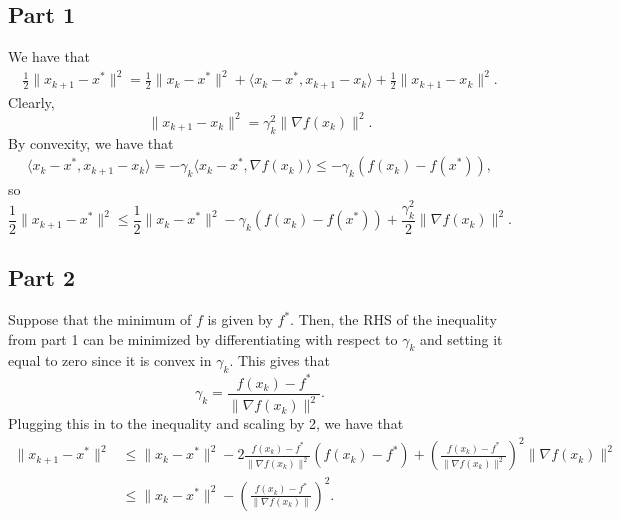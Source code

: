 \documentclass{article}
\begin{document}
\subsection{Part 1}
We have that 
\begin{align*}
\frac{1}{2}\|x_{k+1}-x^*\|^2=\frac{1}{2}\|x_k-x^*\|^2+\langle x_{k}-x^*,x_{k+1}-x_k\rangle+\frac{1}{2}\|x_{k+1}-x_k\|^2.
\end{align*}
Clearly,
\[
\|x_{k+1}-x_k\|^2=\gamma_k^2\|\nabla f(x_k)\|^2.
\]
By convexity, we have that 
\begin{align*}
\langle x_{k}-x^*,x_{k+1}-x_k\rangle=-\gamma_k\langle x_{k}-x^*,\nabla f(x_k)\rangle\leq-\gamma_k(f(x_k)-f(x^*)),
\end{align*}
so
\[
\frac{1}{2}\|x_{k+1}-x^*\|^2\leq\frac{1}{2}\|x_k-x^*\|^2-\gamma_k(f(x_k)-f(x^*))+\frac{\gamma_k^2}{2}\|\nabla f(x_k)\|^2.
\]
\subsection{Part 2}
Suppose that the minimum of $f$ is given by $f^*$. Then, the RHS of the inequality from part 1 can be minimized by differentiating with respect to $\gamma_k$ and setting it equal to zero since it is convex in $\gamma_k$. This gives that 
\[
\gamma_k=\frac{f(x_k)-f^*}{\|\nabla f(x_k)\|^2}.
\]
Plugging this in to the inequality and scaling by 2, we have that 
\begin{align*}
\|x_{k+1}-x^*\|^2&\leq\|x_{k}-x^*\|^2-2\frac{f(x_k)-f^*}{\|\nabla f(x_k)\|^2}(f(x_k)-f^*)+\left(\frac{f(x_k)-f^*}{\|\nabla f(x_k)\|^2}\right)^2\|\nabla f(x_k)\|^2\\&\leq
\|x_{k}-x^*\|^2-\left(\frac{f(x_k)-f^*}{\|\nabla f(x_k)\|}\right)^2.
\end{align*}
\end{document}
